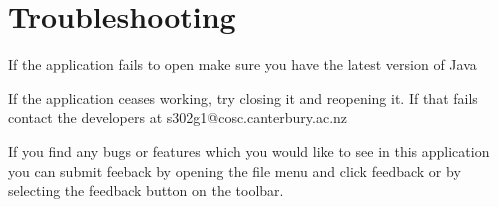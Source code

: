 \section{Troubleshooting}

If the application fails to open make sure you have the latest version of Java

If the application ceases working, try closing it and reopening it. If that fails contact the developers at s302g1@cosc.canterbury.ac.nz

If you find any bugs or features which you would like to see in this application you can submit feeback by opening the file menu and click feedback or by selecting the feedback button on the toolbar.